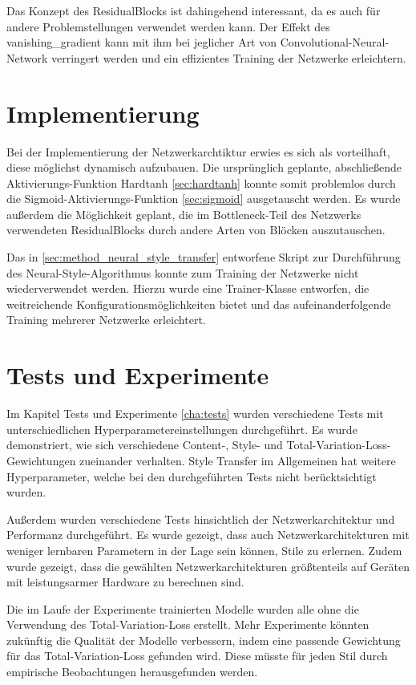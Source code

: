 Das Konzept des ResidualBlocks ist dahingehend interessant, da es auch für andere Problemstellungen verwendet werden kann. Der Effekt des \gls{vanishing_gradient} kann mit ihm bei jeglicher Art von Convolutional-Neural-Network verringert werden und ein effizientes Training der Netzwerke erleichtern.

\section{Implementierung}

Bei der Implementierung der Netzwerkarchtiktur erwies es sich als vorteilhaft, diese möglichst dynamisch aufzubauen. Die ursprünglich geplante, abschließende Aktivierungs-Funktion Hardtanh \ref{sec:hardtanh} konnte somit problemlos durch die Sigmoid-Aktivierungs-Funktion \ref{sec:sigmoid} ausgetauscht werden. Es wurde außerdem die Möglichkeit geplant, die im Bottleneck-Teil des Netzwerks verwendeten ResidualBlocks durch andere Arten von Blöcken auszutauschen.

Das in \ref{sec:method_neural_style_transfer} entworfene Skript zur Durchführung des Neural-Style-Algorithmus konnte zum Training der Netzwerke nicht wiederverwendet werden. Hierzu wurde eine Trainer-Klasse entworfen, die weitreichende Konfigurationsmöglichkeiten bietet und das aufeinanderfolgende Training mehrerer Netzwerke erleichtert.

\section{Tests und Experimente}

Im Kapitel Tests und Experimente \ref{cha:tests} wurden verschiedene Tests mit unterschiedlichen Hyperparametereinstellungen durchgeführt.
Es wurde demonstriert, wie sich verschiedene Content-, Style- und Total-Variation-Loss-Gewichtungen zueinander verhalten. Style Transfer im Allgemeinen hat weitere Hyperparameter, welche bei den durchgeführten Tests nicht berücktsichtigt wurden.

Außerdem wurden verschiedene Tests hinsichtlich der Netzwerkarchitektur und Performanz durchgeführt. Es wurde gezeigt, dass auch Netzwerkarchitekturen mit weniger lernbaren Parametern in der Lage sein können, Stile zu erlernen. Zudem wurde gezeigt, dass die gewählten Netzwerkarchitekturen größtenteils auf Geräten mit leistungsarmer Hardware zu berechnen sind.

Die im Laufe der Experimente trainierten Modelle wurden alle ohne die Verwendung des Total-Variation-Loss erstellt. Mehr Experimente könnten zukünftig die Qualität der Modelle verbessern, indem eine passende Gewichtung für das Total-Variation-Loss gefunden wird. Diese müsste für jeden Stil durch empirische Beobachtungen herausgefunden werden.